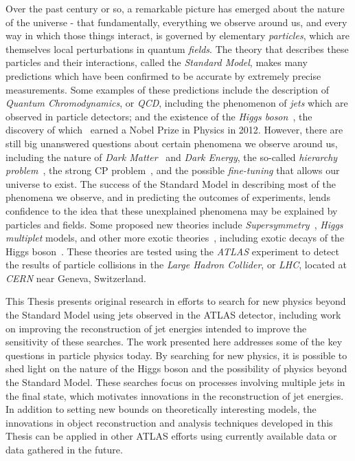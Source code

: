 Over the past century or so, a remarkable picture has emerged about the nature of the universe - that fundamentally, everything we observe around us, and every way in which those things interact, is governed by elementary \textit{particles}, which are themselves local perturbations in quantum \textit{fields}.
The theory that describes these particles and their interactions, called the \textit{Standard Model}, makes many predictions which have been confirmed to be accurate by extremely precise measurements.
Some examples of these predictions include the description of \textit{Quantum Chromodynamics}\cite{ref:TODO}, or \textit{QCD}, including the phenomenon of \textit{jets}\cite{ref:TODO} which are observed in particle detectors; and the existence of the \textit{Higgs boson}~\cite{Englert:1964et,Higgs:1964pj,Higgs:1964ia,Guralnik:1964eu}, the discovery of which~\cite{HIGG-2012-27,CMS-HIG-12-028} earned a Nobel Prize in Physics in 2012\cite{ref:TODO}.
However, there are still big unanswered questions about certain phenomena we observe around us, including the nature of \textit{Dark Matter}~\cite{Trimble:1987ee} and \textit{Dark Energy}\cite{ref:TODO}, the so-called \textit{hierarchy problem}~\cite{Nilles:1982dy}, the strong CP problem~\cite{Peccei:1977hh}, and the possible \textit{fine-tuning}\cite{ref:TODO} that allows our universe to exist.
The success of the Standard Model in describing most of the phenomena we observe, and in predicting the outcomes of experiments, lends confidence to the idea that these unexplained phenomena may be explained by particles and fields.
Some proposed new theories include \textit{Supersymmetry}~\cite{ref:TODO,Dobrescu:2000yn,Ellwanger:2003jt,Dermisek:2005ar,Chang:2008cw,Morrissey:2008gm}, \textit{Higgs multiplet} models\cite{ref:TODO}, and other more exotic theories~\cite{ref:TODO}, including exotic decays of the Higgs boson~\cite{Curtin:2013fra}. %
These theories are tested using the \textit{ATLAS} experiment\cite{PERF-2007-01} to detect the results of particle collisions in the \textit{Large Hadron Collider}, or \textit{LHC}, located at \textit{CERN} near Geneva, Switzerland.

This Thesis presents original research in efforts to search for new physics beyond the Standard Model using jets observed in the ATLAS detector, including work on improving the reconstruction of jet energies intended to improve the sensitivity of these searches.
The work presented here addresses some of the key questions in particle physics today.
By searching for new physics, it is possible to shed light on the nature of the Higgs boson and the possibility of physics beyond the Standard Model. 
These searches focus on processes involving multiple jets in the final state, which motivates innovations in the reconstruction of jet energies.
In addition to setting new bounds on theoretically interesting models,
the innovations in object reconstruction and analysis techniques developed in this Thesis can be applied in other ATLAS efforts using currently available data or data gathered in the future.

